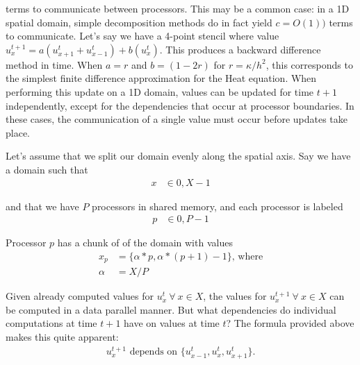 terms to communicate between processors. This may be a common case: in a 1D
spatial domain, simple decomposition methods do in fact yield $c = O(1))$ terms
to communicate. Let's say we have a 4-point stencil where value $u^{t+1}_x =
a(u^{t}_{x+1} + u^{t}_{x-1}) + b(u^{t}_{x})$. This produces a backward difference
method in time. When $a = r$ and $b = (1-2r)$ for $r = \kappa / h^2$, this
corresponds to the simplest finite difference approximation for the Heat
equation. When performing this update on a 1D domain, values can be updated for
time $t+1$ independently, except for the dependencies that occur at processor
boundaries. In these cases, the communication of a single value must occur
before updates take place.

Let's assume that we split our domain evenly along the spatial axis. Say we have
a domain such that
\begin{align*}
    x &\in {0, X-1} 
\end{align*}

and that we have $P$ processors in shared memory, and each processor is labeled
\begin{align*}
    p &\in {0, P-1}
\end{align*}

Processor $p$ has a chunk of of the domain with values 
\begin{align*}
    x_p     &= \{\alpha*p, \alpha*(p+1)-1\} \text{, where} \\
    \alpha  &= X / P 
\end{align*}

Given already computed values for $u^{t}_{x} ~ \forall ~ x \in X$, the values for
$u^{t+1}_{x} ~ \forall ~ x \in X$ can be computed in a data parallel manner. But
what dependencies do individual computations at time $t+1$ have on values at
time $t$? The formula provided above makes this quite apparent:
\begin{align*}
    u^{t+1}_{x} \text{ depends on } \{ u^{t}_{x-1}, u^{t}_{x}, u^{t}_{x+1} \}
    \text{.}
\end{align*}

